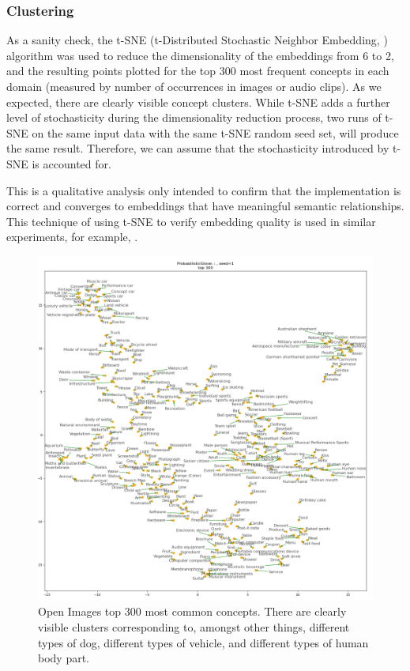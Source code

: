 \newpage
\subsubsection{Clustering}
As a sanity check, the t-SNE (t-Distributed Stochastic Neighbor Embedding, \cite{tsne}) algorithm was  used to reduce the dimensionality of the embeddings from 6 to 2, and the resulting points plotted for the top 300 most frequent concepts in each domain (measured by number of occurrences in images or audio clips). As we expected, there are clearly visible concept clusters.  While t-SNE adds a further level of stochasticity during the dimensionality reduction process, two runs of t-SNE on the same input data with the same t-SNE random seed set, will produce the same result. Therefore, we can assume that the stochasticity introduced by t-SNE is accounted for. 

This is a qualitative analysis only intended to confirm that the implementation is correct and converges to embeddings that have meaningful semantic relationships. This technique of using t-SNE to verify embedding quality is used in similar experiments, for example, \cite{CoocurrenceVisionLanguage2021}. 

\begin{figure}[H]
\label{fig:gloveclusters}
    \centering
    \includegraphics[width=\textwidth]{images/method/probabilistic_independent/top300_tsne_openimages__ProbabilisticGlove_1.png}
    \caption{
        Open Images top 300 most common concepts. There are clearly visible clusters corresponding to, amongst other things, different types of dog, different types of vehicle, and different types of human body part.
    }
\end{figure}

